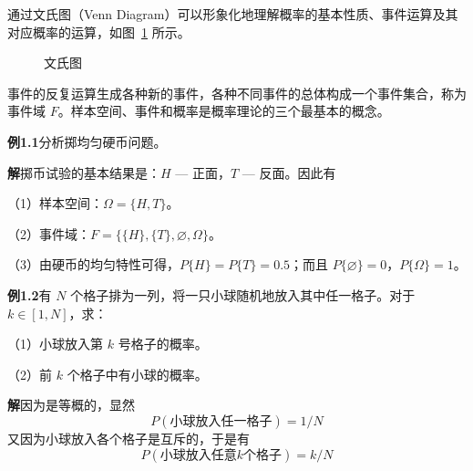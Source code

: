 \documentclass[11pt,openany,UTF8]{ctexbook}
\begin{document}
通过文氏图（Venn Diagram\nobreak）可以形象化地理解概率的基本性质\nobreak、事件运算及其对应概率的运算\nobreak，如图~\ref{fig:1.2} 所示\nobreak。

\begin{figure}[htbp]
  \centering
  \caption{文氏图}
  \label{fig:1.2}
\end{figure}

事件的反复运算生成各种新的事件\nobreak，各种不同事件的总体构成一个事件集合\nobreak，称为事件域 $F$\nobreak。样本空间\nobreak、事件和概率是概率理论的三个最基本的概念\nobreak。

\begin{examplebox}
\textbf{例1.1}\quad 分析掷均匀硬币问题\nobreak。

\textbf{解}\quad 掷币试验的基本结果是\nobreak：$H$ — 正面\nobreak，$T$ — 反面\nobreak。因此有

（1\nobreak）样本空间\nobreak：$\Omega=\{H,T\}$\nobreak。

（2\nobreak）事件域\nobreak：$F=\bigl\{\{H\},\{T\},\varnothing,\Omega\bigr\}$\nobreak。

（3\nobreak）由硬币的均匀特性可得\nobreak，$P\{H\}=P\{T\}=0.5$\nobreak；而且 $P\{\varnothing\}=0$\nobreak，$P\{\Omega\}=1$\nobreak。

\textbf{例1.2}\quad 有 $N$ 个格子排为一列\nobreak，将一只小球随机地放入其中任一格子\nobreak。对于 $k\in[1,N]$\nobreak，求\nobreak：

（1\nobreak）小球放入第 $k$ 号格子的概率\nobreak。

（2\nobreak）前 $k$ 个格子中有小球的概率\nobreak。

\textbf{解}\quad 因为是等概的\nobreak，显然
\[
P(\text{小球放入任一格子})=1/N
\]
又因为小球放入各个格子是互斥的\nobreak，于是有
\[
P(\text{小球放入任意}k\text{个格子})=k/N
\]
\end{examplebox}
\end{document}
